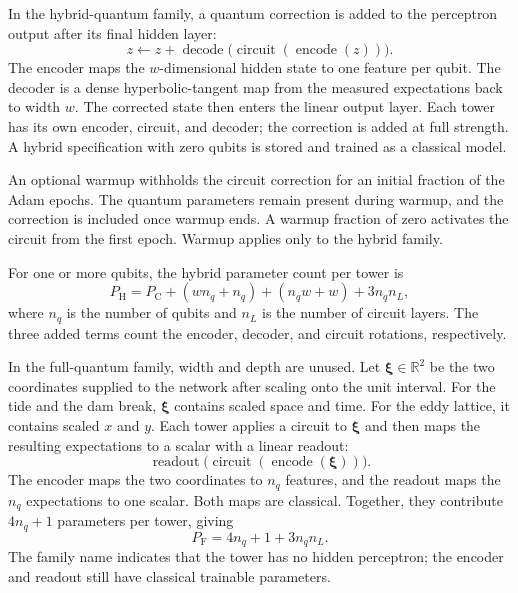 \documentclass{erdc}
\begin{document}
In the hybrid-quantum family, a quantum correction is added to the
perceptron output after its final hidden layer:
\begin{equation}
\label{eq:hybrid}
z \leftarrow z +
\operatorname{decode}\!\big(
\operatorname{circuit}(\operatorname{encode}(z))
\big).
\end{equation}
The encoder maps the \(w\)-dimensional hidden state to one feature per
qubit. The decoder is a dense hyperbolic-tangent map from the measured
expectations back to width \(w\). The corrected state then enters the
linear output layer. Each tower has its own encoder, circuit, and
decoder; the correction is added at full strength. A hybrid
specification with zero qubits is stored and trained as a classical
model.

An optional warmup withholds the circuit correction for an initial
fraction of the Adam epochs. The quantum parameters remain present
during warmup, and the correction is included once warmup ends. A
warmup fraction of zero activates the circuit from the first epoch.
Warmup applies only to the hybrid family.

For one or more qubits, the hybrid parameter count per tower is
\begin{equation}
\label{eq:hybrid-count}
P_{\mathrm{H}}
= P_{\mathrm{C}}
+ (wn_{q}+n_{q})
+ (n_{q}w+w)
+ 3n_{q}n_{L},
\end{equation}
where \(n_{q}\) is the number of qubits and \(n_{L}\) is the number of
circuit layers. The three added terms count the encoder, decoder, and
circuit rotations, respectively.

In the full-quantum family, width and depth are unused. Let
\(\boldsymbol{\xi}\in\mathbb{R}^{2}\) be the two coordinates supplied
to the network after scaling onto the unit interval. For the tide and
the dam break, \(\boldsymbol{\xi}\) contains scaled space and time.
For the eddy lattice, it contains scaled \(x\) and \(y\). Each
tower applies a circuit to \(\boldsymbol{\xi}\) and then maps the
resulting expectations to a scalar with a linear readout:
\begin{equation}
\label{eq:fullq}
\operatorname{readout}\!\big(
\operatorname{circuit}(\operatorname{encode}(\boldsymbol{\xi}))
\big).
\end{equation}
The encoder maps the two coordinates to \(n_{q}\) features, and the
readout maps the \(n_{q}\) expectations to one scalar. Both maps are
classical. Together, they contribute \(4n_{q}+1\) parameters per
tower, giving
\begin{equation}
\label{eq:fullq-count}
P_{\mathrm{F}}
= 4n_{q}+1+3n_{q}n_{L}.
\end{equation}
The family name indicates that the tower has no hidden perceptron; the
encoder and readout still have classical trainable parameters.
\end{document}
